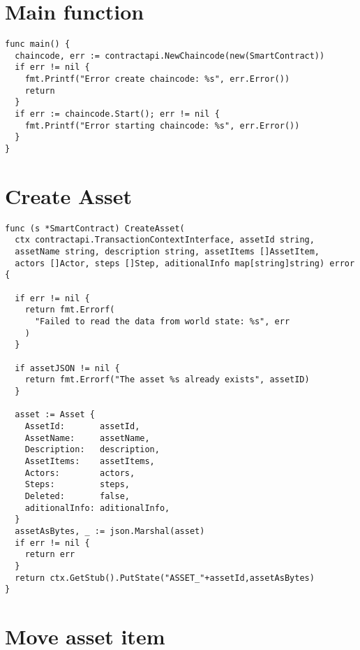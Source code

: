 \section{Main function}{} %
\label{app:main}

\begin{verbatim}
func main() {
  chaincode, err := contractapi.NewChaincode(new(SmartContract))
  if err != nil {
    fmt.Printf("Error create chaincode: %s", err.Error())
    return
  }
  if err := chaincode.Start(); err != nil {
    fmt.Printf("Error starting chaincode: %s", err.Error())
  }
}
\end{verbatim}

\section{Create Asset}{} %
\label{app:CreateAsset}

\begin{verbatim}
func (s *SmartContract) CreateAsset(
  ctx contractapi.TransactionContextInterface, assetId string,
  assetName string, description string, assetItems []AssetItem, 
  actors []Actor, steps []Step, aditionalInfo map[string]string) error {
  
  if err != nil {
    return fmt.Errorf(
      "Failed to read the data from world state: %s", err
    )
  }

  if assetJSON != nil {
    return fmt.Errorf("The asset %s already exists", assetID)
  }
  
  asset := Asset {
    AssetId:       assetId,
    AssetName:     assetName,
    Description:   description,
    AssetItems:    assetItems,
    Actors:        actors,
    Steps:         steps,
    Deleted:       false,
    aditionalInfo: aditionalInfo,
  }
  assetAsBytes, _ := json.Marshal(asset)
  if err != nil {
    return err
  }
  return ctx.GetStub().PutState("ASSET_"+assetId,assetAsBytes)
}
\end{verbatim}

\section{Move asset item}{} %
\label{app:MoveAssetItem}

